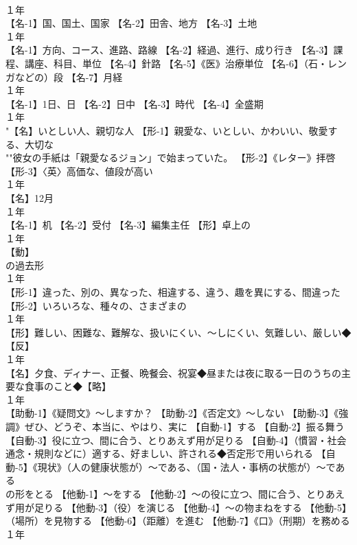 \documentclass[8pt]{extreport}
\begin{document}
\begin{CJK}{UTF8}{min}
\\	１年	
\\	【名-1】国、国土、国家 【名-2】田舎、地方 【名-3】土地
\\	１年	
\\	【名-1】方向、コース、進路、路線 【名-2】経過、進行、成り行き 【名-3】課程、講座、科目、単位 【名-4】針路 【名-5】《医》治療単位 【名-6】（石・レンガなどの）段 【名-7】月経
\\	１年	
\\	【名-1】1日、日 【名-2】日中 【名-3】時代 【名-4】全盛期
\\	１年	
\\	"【名】いとしい人、親切な人 【形-1】親愛な、いとしい、かわいい、敬愛する、大切な 
\\	""彼女の手紙は「親愛なるジョン」で始まっていた。 【形-2】《レター》拝啓 【形-3】〈英〉高価な、値段が高い
\\	１年	
\\	【名】12月
\\	１年	
\\	【名-1】机 【名-2】受付 【名-3】編集主任 【形】卓上の
\\	１年	
\\	【動】
\\	の過去形
\\	１年	
\\	【形-1】違った、別の、異なった、相違する、違う、趣を異にする、間違った 【形-2】いろいろな、種々の、さまざまの
\\	１年	
\\	【形】難しい、困難な、難解な、扱いにくい、～しにくい、気難しい、厳しい◆【反】
\\	１年	
\\	【名】夕食、ディナー、正餐、晩餐会、祝宴◆昼または夜に取る一日のうちの主要な食事のこと◆【略】
\\	１年	
\\	【助動-1】《疑問文》～しますか？ 【助動-2】《否定文》～しない 【助動-3】《強調》ぜひ、どうぞ、本当に、やはり、実に 【自動-1】する 【自動-2】振る舞う 【自動-3】役に立つ、間に合う、とりあえず用が足りる 【自動-4】（慣習・社会通念・規則などに）適する、好ましい、許される◆否定形で用いられる 【自動-5】《現状》（人の健康状態が）～である、（国・法人・事柄の状態が）～である
\\	の形をとる 【他動-1】～をする 【他動-2】～の役に立つ、間に合う、とりあえず用が足りる 【他動-3】（役）を演じる 【他動-4】～の物まねをする 【他動-5】（場所）を見物する 【他動-6】（距離）を進む 【他動-7】《口》（刑期）を務める
\\	１年	

\end{CJK}
\end{document}
